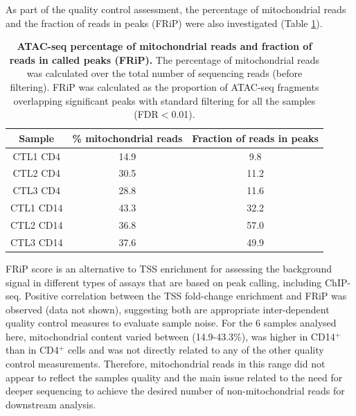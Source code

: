 As part of the quality control assessment, the percentage of mitochondrial reads and the fraction of reads in peaks (FRiP) were also investigated (Table \ref{tab:ATAC_MT_fraction_reads_in_peaks}). 

\begin{table}[htbp]
\centering
\begin{tabular}{@{} c c c}
\toprule
\textbf{Sample} & \textbf{\% mitochondrial reads} & \textbf{Fraction of reads in peaks} \\
\midrule
\midrule
CTL1 CD4 & 14.9 & 9.8 \\
CTL2 CD4 & 30.5 & 11.2 \\
CTL3 CD4 & 28.8 & 11.6 \\
CTL1 CD14 & 43.3 & 32.2 \\
CTL2 CD14 & 36.8 & 57.0 \\
CTL3 CD14 & 37.6 & 49.9 \\
\bottomrule
\end{tabular}
\medskip %
\caption[ATAC-seq percentage of mitochondrial reads and fraction of reads in called peaks (FRiP).]{\textbf{ATAC-seq percentage of mitochondrial reads and fraction of reads in called peaks (FRiP).} The percentage of mitochondrial reads was calculated over the total number of sequencing reads (before filtering). FRiP was calculated as the proportion of ATAC-seq fragments overlapping significant peaks with standard filtering for all the samples (FDR$<$0.01).}
\label{tab:ATAC_MT_fraction_reads_in_peaks}
\end{table}
\bigskip %


FRiP score is an alternative to TSS enrichment for assessing the background signal in different types of assays that are based on peak calling, including ChIP-seq. Positive correlation between the TSS fold-change enrichment and FRiP was observed (data not shown), suggesting both are appropriate inter-dependent quality control measures to evaluate sample noise. For the 6 samples analysed here, mitochondrial content varied between (14.9-43.3\%), was higher in CD14$^+$ than in CD4$^+$ cells and was not directly related to any of the other quality control measurements. Therefore, mitochondrial reads in this range did not appear to reflect the samples quality and the main issue related to the need for deeper sequencing to achieve the desired number of non-mitochondrial reads for downstream analysis.


